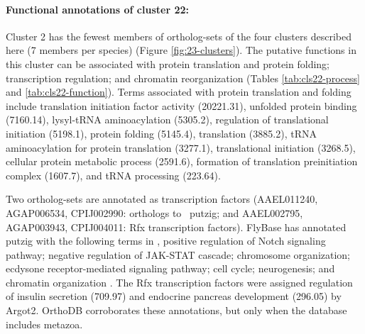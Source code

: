 \paragraph*{Functional annotations of cluster 22:}






Cluster 2 has the fewest members of ortholog-sets of the four clusters described here (7 members per species) (Figure \ref{fig:23-clusters}).
%
The putative functions in this cluster can be associated with protein translation and protein folding; transcription regulation; and chromatin reorganization (Tables \ref{tab:cls22-process} and \ref{tab:cls22-function}).
%
Terms associated with protein translation and folding include translation initiation factor activity (20221.31), unfolded protein binding (7160.14), lysyl-tRNA aminoacylation (5305.2), regulation of translational initiation (5198.1), protein folding (5145.4), translation (3885.2), tRNA aminoacylation for protein translation (3277.1), translational initiation (3268.5), cellular protein metabolic process (2591.6), formation of translation preinitiation complex (1607.7), and tRNA processing (223.64).




Two ortholog-sets are annotated as transcription factors (AAEL011240, AGAP006534, CPIJ002990: orthologs to \Dm\ putzig; and AAEL002795, AGAP003943, CPIJ004011: Rfx transcription factors).
%
FlyBase has annotated putzig with the following terms in \Dm, positive regulation of Notch signaling pathway; negative regulation of JAK-STAT cascade; chromosome organization; ecdysone receptor-mediated signaling pathway; cell cycle; neurogenesis; and chromatin organization \cite{Marygold2013}.
%
The Rfx transcription factors were assigned regulation of insulin secretion (709.97) and endocrine pancreas development (296.05) by \gls{Argot2}.
%
OrthoDB corroborates these annotations, but only when the database includes metazoa.

